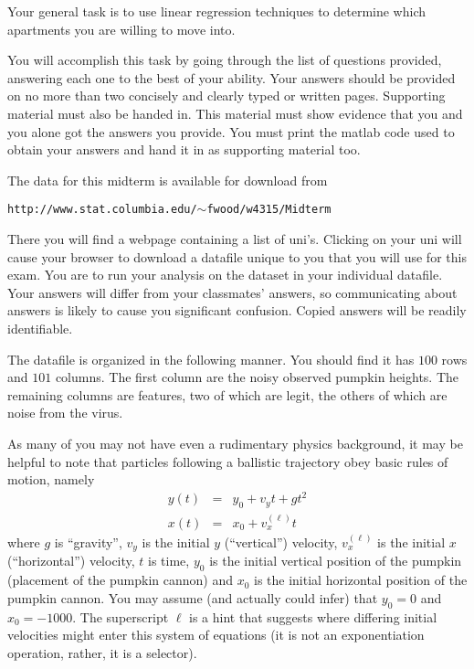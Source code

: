 \documentclass[12pt]{article}
\begin{document}
Your general task is to use linear regression techniques to determine which apartments you are willing to move into. \newline

You will accomplish this task by going through the list of questions provided, answering each one to the best of your ability.  Your answers should be provided on no more than two concisely and clearly typed or written pages.  Supporting material must also be handed in.  This material must show evidence that you and you alone got the answers you provide.  You must print the matlab code used to obtain your answers and hand it in as supporting material too. \newline

The data for this midterm is available for download from \newline

\texttt{http://www.stat.columbia.edu/$\sim$fwood/w4315/Midterm}\newline

There you will find a webpage containing a list of uni's.  Clicking on your uni will cause your browser to download a datafile unique to you that you will use for this exam.  You are to run your analysis on the dataset in your individual datafile.  Your answers will differ from your classmates' answers, so communicating about answers is likely to cause you significant confusion.  Copied answers will be readily identifiable.\newline

The datafile is organized in the following manner.  You should find it has $100$ rows and $101$ columns.  The first column are the noisy observed pumpkin heights.  The remaining columns are features, two of which are legit, the others of which are noise from the virus. \newline

As many of you may not have even a rudimentary physics background, it may be helpful to note that particles following a ballistic trajectory obey basic rules of motion, namely
\begin{eqnarray*}
y(t) &=& y_0 + v_y  t + g t^2 \\
x(t) &=& x_0 + v_x^{(\ell)} t
\end{eqnarray*}
where $g$ is ``gravity'', $v_y$ is the initial $y$ (``vertical'') velocity, $v_x^{(\ell)}$ is the initial $x$ (``horizontal'') velocity, $t$ is time, $y_0$ is the initial vertical position of the pumpkin (placement of the pumpkin cannon) and $x_0$ is the initial horizontal position of the pumpkin cannon.  You may assume (and actually could infer) that $y_0=0$ and $x_0=-1000$.  The superscript $\ell$ is a hint that suggests where differing initial velocities might enter this system of equations (it is not an exponentiation operation, rather, it is a selector). \newline
\end{document}
